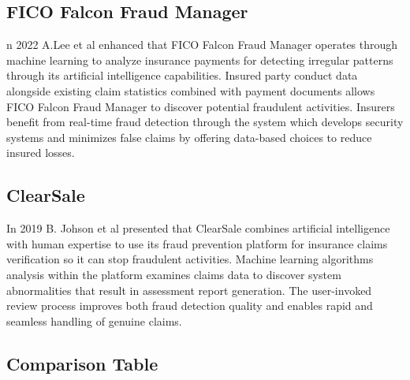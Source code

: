 \subsection{FICO Falcon Fraud Manager}
n 2022 A.Lee et al enhanced that FICO Falcon Fraud Manager operates through machine learning to analyze insurance payments for detecting irregular patterns through its artificial intelligence capabilities. Insured party conduct data alongside existing claim statistics combined with payment documents allows FICO Falcon Fraud Manager to discover potential fraudulent activities. Insurers benefit from real-time fraud detection through the system which develops security systems and minimizes false claims by offering data-based choices to reduce insured losses\cite{lee2022}.


\subsection{ClearSale}
In 2019 B. Johson et al presented that ClearSale combines artificial intelligence with human expertise to use its fraud prevention platform for insurance claims verification so it can stop fraudulent activities. Machine learning algorithms analysis within the platform examines claims data to discover system abnormalities that result in assessment report generation. The user-invoked review process improves both fraud detection quality and enables rapid and seamless handling of genuine claims\cite{johnson2019}.

\subsection{Comparison Table}

\renewcommand{\arraystretch}{1.3}
\setlength{\tabcolsep}{4pt}
\small

